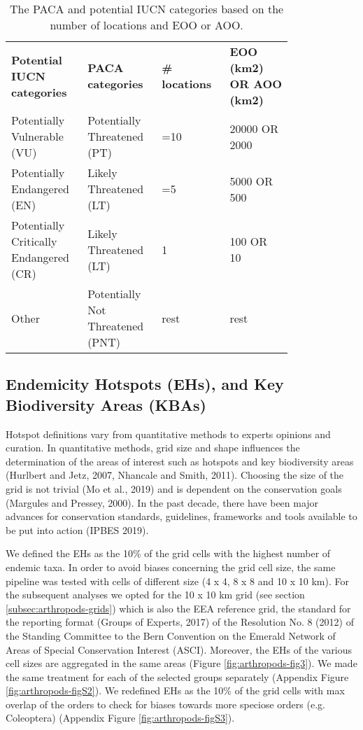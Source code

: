 \begin{table}
\centering
\caption{The PACA and potential IUCN categories based on the number of locations and EOO or AOO.}
\begin{tabular}{p{0.2\linewidth} | p{0.2\linewidth} | p{0.2\linewidth} | p{0.2\linewidth}}
\textbf{Potential IUCN categories}     & \textbf{PACA categories}         & \textbf{\# locations} & \textbf{EOO (km2) OR AOO (km2)}  \\
Potentially Vulnerable (VU)            & Potentially Threatened (PT)      & =10                   & 20000 OR 2000                    \\
Potentially Endangered (EN)            & Likely Threatened (LT)           & =5                    & 5000 OR 500                      \\
Potentially Critically Endangered (CR) & Likely Threatened (LT)           & 1                     & 100 OR 10                        \\
Other                                  & Potentially Not Threatened (PNT) & rest                  & rest                            
\end{tabular}
\label{table:arthropods-paca}
\end{table}
    
    \subsection{Endemicity Hotspots (EHs), and Key Biodiversity Areas (KBAs)}
    \label{subsec:arthropods-ehs-kbas}

Hotspot definitions vary from quantitative methods to experts opinions and curation.
In quantitative methods, grid size and shape influences the determination of
the areas of interest such as hotspots and key biodiversity areas (Hurlbert and Jetz, 2007, Nhancale and Smith, 2011).
Choosing the size of the grid is not trivial (Mo et al., 2019) and is dependent
on the conservation goals (Margules and Pressey, 2000). In the past decade,
there have been major advances for conservation standards, guidelines,
frameworks and tools available to be put into action (IPBES 2019).

We defined the EHs as the 10\% of the grid cells with the highest number of
endemic taxa. In order to avoid biases concerning the grid cell size, the same
pipeline was tested with cells of different size (4 x 4, 8 x 8 and 10 x 10 km).
For the subsequent analyses we opted for the 10 x 10 km grid (see section \ref{subsec:arthropods-grids})
which is also the EEA reference grid, the standard for the reporting format
(Groups of Experts, 2017) of the Resolution No. 8 (2012) of the Standing Committee
to the Bern Convention on the Emerald Network of Areas of Special Conservation Interest (ASCI).
Moreover, the EHs of the various cell sizes are aggregated in the same areas (Figure \ref{fig:arthropods-fig3}).
We made the same treatment for each of the selected groups separately (Appendix Figure \ref{fig:arthropods-figS2}).
We redefined EHs as the 10\% of the grid cells with max overlap of the orders
to check for biases towards more speciose orders (e.g. Coleoptera) (Appendix Figure \ref{fig:arthropods-figS3}).

